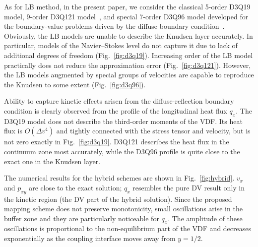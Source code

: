 \documentclass[]{elsarticle} %
\newcommand{\OO}[1]{O(#1)}
\begin{document}
{%
As for LB method, in the present paper, we consider the classical 5-order D3Q19 model, 9-order D3Q121 model~\cite{Shan2010},
and special 7-order D3Q96 model developed for the boundary-value problems driven by the diffuse boundary condition~\cite{Feuchter2016}.
Obviously, the LB models are unable to describe the Knudsen layer accurately.
In particular, models of the Navier--Stokes level do not capture it due to lack of additional degrees of freedom (Fig.~\ref{fig:d3q19}).
Increasing order of the LB model practically does not reduce the approximation error (Fig.~\ref{fig:d3q121}).
However, the LB models augmented by special groups of velocities are capable to reproduce the Knudsen to some extent (Fig.~\ref{fig:d3q96}).

Ability to capture kinetic effects arisen from the diffuse-reflection boundary condition
is clearly observed from the profile of the longitudinal heat flux \(q_x\).
The D3Q19 model does not describe the third-order moments of the VDF.
Its heat flux is \(\OO{\Delta v^4}\) and tightly connected with the stress tensor and velocity, but is not zero exactly in Fig.~\ref{fig:d3q19}.
D3Q121 describes the heat flux in the continuum zone most accurately, while the D3Q96 profile is quite close to the exact one in the Knudsen layer.

The numerical results for the hybrid schemes are shown in Fig.~\ref{fig:hybrid}.
\(v_x\) and \(p_{xy}\) are close to the exact solution;
\(q_x\) resembles the pure DV result only in the kinetic region (the DV part of the hybrid solution).
Since the proposed mapping scheme does not preserve monotonicity,
small oscillations arise in the buffer zone and they are particularly noticeable for \(q_x\).
The amplitude of these oscillations is proportional to the non-equilibrium part of the VDF
and decreases exponentially as the coupling interface moves away from \(y=1/2\).

}
\end{document}
